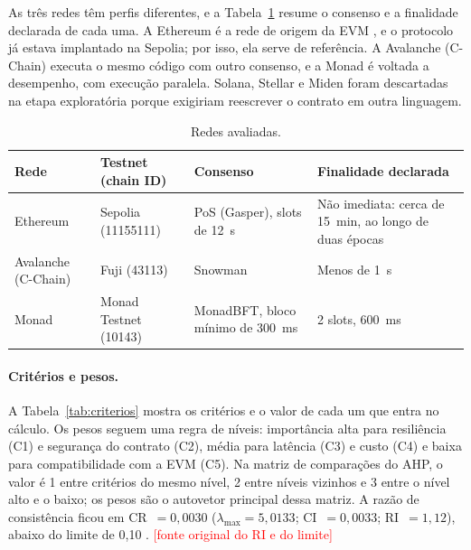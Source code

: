 \documentclass[10pt,a4paper]{article}
\newcommand{\pendente}[1]{\textcolor{red}{[#1]}}
\begin{document}
As três redes têm perfis diferentes, e a Tabela~\ref{tab:redes} resume o consenso e a finalidade declarada de cada uma. A Ethereum é a rede de origem da EVM \cite{ethereum2024evm}, e o protocolo já estava implantado na Sepolia; por isso, ela serve de referência. A Avalanche (C-Chain) executa o mesmo código com outro consenso, e a Monad é voltada a desempenho, com execução paralela. Solana, Stellar e Miden foram descartadas na etapa exploratória porque exigiriam reescrever o contrato em outra linguagem.

\begin{table}[ht]
\centering
\caption{Redes avaliadas.}\label{tab:redes}
\small
\begin{tabularx}{\linewidth}{@{}lllX@{}}
\toprule
Rede & Testnet (chain ID) & Consenso & Finalidade declarada \\
\midrule
Ethereum & Sepolia (11155111) & PoS (Gasper), slots de 12~s & Não imediata: cerca de 15~min, ao longo de duas épocas \cite{ethereum2024ssf} \\
Avalanche (C-Chain) & Fuji (43113) & Snowman & Menos de 1~s \cite{avalanche2024consensus} \\
Monad & Monad Testnet (10143) & MonadBFT, bloco mínimo de 300~ms & 2 slots, 600~ms \cite{monad2024bft} \\
\bottomrule
\end{tabularx}
\end{table}

\paragraph{Critérios e pesos.} A Tabela~\ref{tab:criterios} mostra os critérios e o valor de cada um que entra no cálculo. Os pesos seguem uma regra de níveis: importância alta para resiliência (C1) e segurança do contrato (C2), média para latência (C3) e custo (C4) e baixa para compatibilidade com a EVM (C5). Na matriz de comparações do AHP, o valor é 1 entre critérios do mesmo nível, 2 entre níveis vizinhos e 3 entre o nível alto e o baixo; os pesos são o autovetor principal dessa matriz. A razão de consistência ficou em CR~$=0{,}0030$ ($\lambda_{\max}=5{,}0133$; CI~$=0{,}0033$; RI~$=1{,}12$), abaixo do limite de 0,10 \cite{saaty2001}. \pendente{fonte original do RI e do limite}
\end{document}

